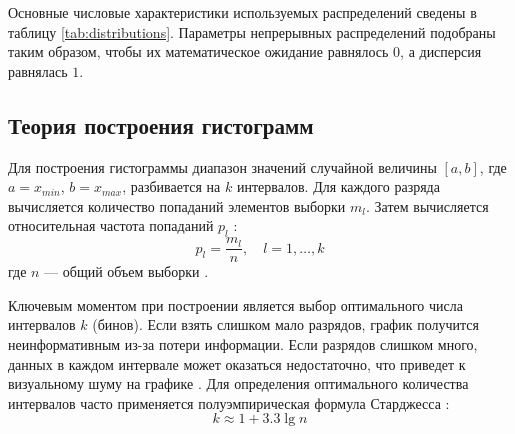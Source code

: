 \documentclass[a4paper, 14pt]{extarticle}
\begin{document}
Основные числовые характеристики используемых распределений сведены в таблицу \ref{tab:distributions}. Параметры непрерывных распределений подобраны таким образом, чтобы их математическое ожидание равнялось $0$, а дисперсия равнялась $1$.

\begin{table}[h]
    \centering
    \caption{Числовые характеристики исследуемых распределений}
    \label{tab:distributions}
\end{table}

\subsection{Теория построения гистограмм}
    
Для построения гистограммы диапазон значений случайной величины $[a, b]$, где $a = x_{min}$, $b = x_{max}$, разбивается на $k$ интервалов. Для каждого разряда вычисляется количество попаданий элементов выборки $m_l$. Затем вычисляется относительная частота попаданий $p_l$ \cite{babakhina}:
\begin{equation*}
    p_l = \frac{m_l}{n}, \quad l = 1, \dots, k
\end{equation*}
где $n$ — общий объем выборки \cite{babakhina}.

Ключевым моментом при построении является выбор оптимального числа интервалов $k$ (бинов). Если взять слишком мало разрядов, график получится неинформативным из-за потери информации. Если разрядов слишком много, данных в каждом интервале может оказаться недостаточно, что приведет к визуальному шуму на графике \cite{babakhina}. Для определения оптимального количества интервалов часто применяется полуэмпирическая формула Старджесса \cite{maksimov}:
\begin{equation*}
    k \approx 1 + 3.3 \lg n
\end{equation*}
\end{document}
